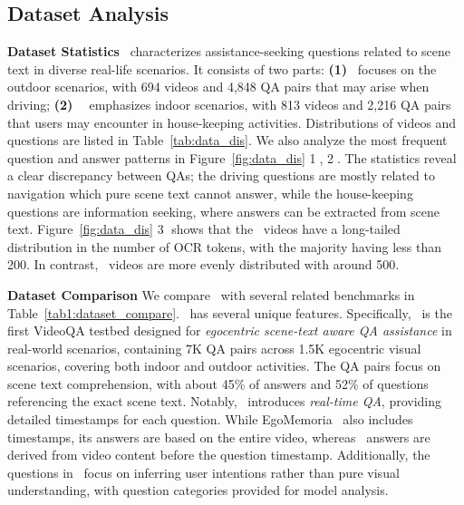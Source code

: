 \subsection{Dataset Analysis}
\noindent\textbf{Dataset Statistics}
\dataset ~characterizes assistance-seeking questions related to scene text in diverse real-life scenarios. It consists of two parts: \textbf{(1) \datasetout}~focuses on the outdoor scenarios, with 694 videos and 4,848 QA pairs that may arise when driving; \textbf{(2) \datasetin~} emphasizes indoor scenarios, with 813 videos and 2,216 QA pairs that users may encounter in house-keeping activities. Distributions of videos and questions are listed in Table~\ref{tab:data_dis}. We also analyze the most frequent question and answer patterns in Figure~\cref{fig:data_dis} \textcircled{1}, \textcircled{2}. The statistics reveal a clear discrepancy between QAs; the driving questions are mostly related to navigation which pure scene text cannot answer, while the house-keeping questions are information seeking, where answers can be extracted from scene text. Figure~\ref{fig:data_dis} \textcircled{3} shows that the 
\textbf{\datasetin}~videos have a long-tailed distribution in the {number of OCR tokens}, with the majority having less than 200.  In contrast, \textbf{\datasetout}~videos are more evenly distributed with around 500. 


\noindent\textbf{Dataset Comparison}
We compare \dataset~with several related benchmarks in Table~\ref{tab1:dataset_compare}. \dataset~has several unique features. Specifically, \dataset~is the first VideoQA testbed designed for \emph{egocentric scene-text aware QA assistance} in real-world scenarios, containing 7K QA pairs across 1.5K egocentric visual scenarios, covering both indoor and outdoor activities. The QA pairs focus on scene text comprehension, with about 45\% of answers and 52\% of questions referencing the exact scene text. Notably, \dataset~introduces \emph{real-time QA}, providing detailed timestamps for each question. While EgoMemoria~\cite{ye2024mm} also includes timestamps, its answers are based on the entire video, whereas \dataset~answers are derived from video content before the question timestamp. Additionally, the questions in \dataset~focus on inferring user intentions rather than pure visual understanding, with question categories provided for model analysis.















